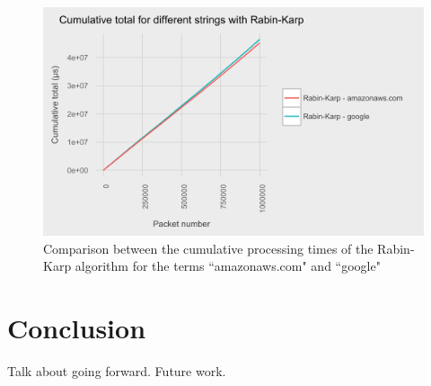 \documentclass{article}
\begin{document}
\begin{figure}[h!bt]
  \centering
  \includegraphics[width=\textwidth]{graphs/term_length_compare-rabin-karp.png}
  \caption{Comparison between the cumulative processing times of the Rabin-Karp algorithm for the terms ``amazonaws.com" and ``google"}
\end{figure}

\section{Conclusion}
Talk about going forward. Future work.
\nocite{*}




\end{document}
